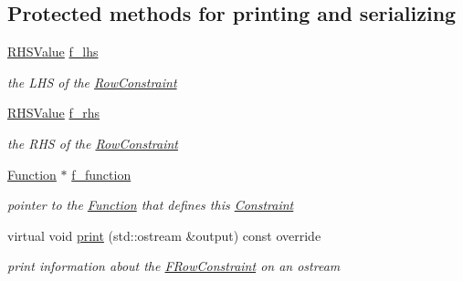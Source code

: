 \subsection*{Protected methods for printing and serializing}
\begin{DoxyCompactItemize}
\item 
\mbox{\label{class_s_m_spp__di__unipi__it_1_1_f_row_constraint_a4a07fa1468749fabf1ebf66e97011086}} 
\mbox{\hyperlink{class_s_m_spp__di__unipi__it_1_1_row_constraint_a8813536ab3b13a81c8e83a999ade3bd8}{R\+H\+S\+Value}} \mbox{\hyperlink{class_s_m_spp__di__unipi__it_1_1_f_row_constraint_a4a07fa1468749fabf1ebf66e97011086}{f\+\_\+lhs}}
\begin{DoxyCompactList}\small\item\em the L\+HS of the \mbox{\hyperlink{class_s_m_spp__di__unipi__it_1_1_row_constraint}{Row\+Constraint}} \end{DoxyCompactList}\item 
\mbox{\label{class_s_m_spp__di__unipi__it_1_1_f_row_constraint_ac41d0fab1f795d45c50f5f342d9d5240}} 
\mbox{\hyperlink{class_s_m_spp__di__unipi__it_1_1_row_constraint_a8813536ab3b13a81c8e83a999ade3bd8}{R\+H\+S\+Value}} \mbox{\hyperlink{class_s_m_spp__di__unipi__it_1_1_f_row_constraint_ac41d0fab1f795d45c50f5f342d9d5240}{f\+\_\+rhs}}
\begin{DoxyCompactList}\small\item\em the R\+HS of the \mbox{\hyperlink{class_s_m_spp__di__unipi__it_1_1_row_constraint}{Row\+Constraint}} \end{DoxyCompactList}\item 
\mbox{\label{class_s_m_spp__di__unipi__it_1_1_f_row_constraint_aad441c18d749a7928722b8418dbcb678}} 
\mbox{\hyperlink{class_s_m_spp__di__unipi__it_1_1_function}{Function}} $\ast$ \mbox{\hyperlink{class_s_m_spp__di__unipi__it_1_1_f_row_constraint_aad441c18d749a7928722b8418dbcb678}{f\+\_\+function}}
\begin{DoxyCompactList}\small\item\em pointer to the \mbox{\hyperlink{class_s_m_spp__di__unipi__it_1_1_function}{Function}} that defines this \mbox{\hyperlink{class_s_m_spp__di__unipi__it_1_1_constraint}{Constraint}} \end{DoxyCompactList}\item 
\mbox{\label{class_s_m_spp__di__unipi__it_1_1_f_row_constraint_a59a9fcbf8f9f86d348344b2073644b0e}} 
virtual void \mbox{\hyperlink{class_s_m_spp__di__unipi__it_1_1_f_row_constraint_a59a9fcbf8f9f86d348344b2073644b0e}{print}} (std\+::ostream \&output) const override
\begin{DoxyCompactList}\small\item\em print information about the \mbox{\hyperlink{class_s_m_spp__di__unipi__it_1_1_f_row_constraint}{F\+Row\+Constraint}} on an ostream \end{DoxyCompactList}\end{DoxyCompactItemize}

